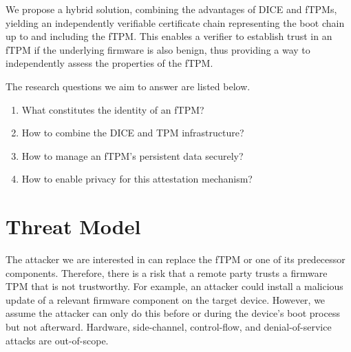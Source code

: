 
We propose a hybrid solution, combining the advantages of \ac{DICE} and \acp{fTPM}, yielding an independently verifiable certificate chain representing the boot chain up to and including the \ac{fTPM}.
This enables a verifier to establish trust in an \ac{fTPM} if the underlying firmware is also benign, thus providing a way to independently assess the properties of the \ac{fTPM}.


The research questions we aim to answer are listed below.
\begin{enumerate}[label=\textbf{RQ-\arabic*}]
  \item What constitutes the identity of an fTPM\@?\label{rq:1-tpm-identity} %
  \item How to combine the DICE and TPM infrastructure?\label{rq:2-combine-infrastructure} %
  \item How to manage an fTPM's persistent data securely?\label{rq:3-secure-data} %
  \item How to enable privacy for this attestation mechanism?\label{rq:4-privacy}
\end{enumerate}



\section{Threat Model}



The attacker we are interested in can replace the fTPM or one of its predecessor components.
Therefore, there is a risk that a remote party trusts a firmware TPM that is not trustworthy.
For example, an attacker could install a malicious update of a relevant firmware component on the target device.
However, we assume the attacker can only do this before or during the device's boot process but not afterward.
Hardware, side-channel, control-flow, and denial-of-service attacks are out-of-scope.

